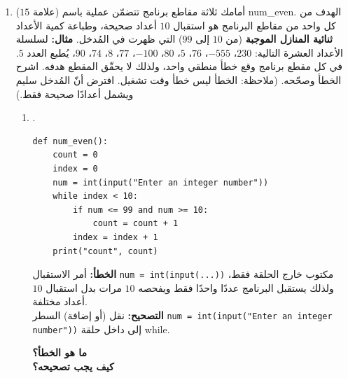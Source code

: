 \documentclass[14pt]{extarticle}
\begin{document}
\begin{enumerate}[label=\textbf{السؤال \arabic*:}, wide=0pt, itemsep=2.2em]
{\begin{longtable}{|C{1.8cm}|p{8.5cm}|C{4cm}|}
\begin{pycell}
\begin{english}
\begin{verbatim}
number = 123
while number > 0:
    print(number % 10)
    number = int(number // 10)
\end{verbatim}
\end{english}
\end{pycell}
& \ifwithsols \begin{english}\texttt{3}\newline\texttt{2}\newline\texttt{1}\end{english} \fi \\
\hline
\end{longtable}}
\filbreak

\item ($15$ علامة) أمامك ثلاثة مقاطع برنامج تتضمّن عملية باسم \textenglish{num\_even}.
الهدف من كل واحد من مقاطع البرنامج هو استقبال $10$ أعداد صحيحة، وطباعة كمية الأعداد \textbf{ثنائية المنازل الموجبة} (من $10$ إلى $99$) التي ظهرت في المُدخل.
\textbf{مثال:} لسلسلة الأعداد العشرة التالية: $230$، $-555$، $76$، $5$، $80$، $-100$، $77$، $8$، $74$، $90$، يُطبع العدد $5$.
في كل مقطع برنامج وقع خطأ منطقي واحد، ولذلك لا يحقّق المقطع هدفه. اشرح الخطأ وصحّحه.
(ملاحظة: الخطأ ليس خطأ وقت تشغيل. افترض أنّ المُدخل سليم ويشمل أعدادًا صحيحة فقط.)

\begin{enumerate}[label=\textbf{مقطع \alph*:}, wide=0pt, itemsep=1.5em]

\item .
\begin{boxCode}
\begin{english}
\begin{verbatim}
def num_even():
    count = 0
    index = 0
    num = int(input("Enter an integer number"))
    while index < 10:
        if num <= 99 and num >= 10:
            count = count + 1
        index = index + 1
    print("count", count)
\end{verbatim}
\end{english}
\end{boxCode}
\ifwithsols
\begin{boxSolution}
\textbf{الخطأ:} أمر الاستقبال \textenglish{\texttt{num = int(input(...))}} مكتوب خارج الحلقة فقط، ولذلك يستقبل البرنامج عددًا واحدًا فقط ويفحصه $10$ مرات بدل استقبال $10$ أعداد مختلفة. \\
\textbf{التصحيح:} نقل (أو إضافة) السطر \textenglish{\texttt{num = int(input("Enter an integer number"))}} إلى داخل حلقة \textenglish{while}.
\end{boxSolution}
\else
\textbf{ما هو الخطأ؟} \underline{\hspace{11cm}} \\
\textbf{كيف يجب تصحيحه؟} \underline{\hspace{10cm}}
\fi
\filbreak


\end{enumerate}
\end{enumerate}
\end{document}
